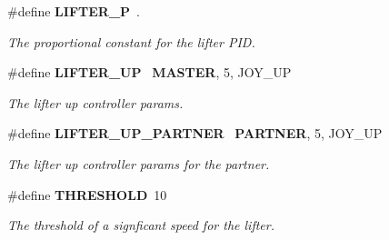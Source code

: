 \begin{DoxyCompactItemize}
\#define \textbf{ L\+I\+F\+T\+E\+R\+\_\+P}~.
\begin{DoxyCompactList}\small\item\em The proportional constant for the lifter P\+ID. \end{DoxyCompactList}\item 
\#define \textbf{ L\+I\+F\+T\+E\+R\+\_\+\+UP}~\textbf{ M\+A\+S\+T\+ER}, 5, J\+O\+Y\+\_\+\+UP
\begin{DoxyCompactList}\small\item\em The lifter up controller params. \end{DoxyCompactList}\item 
\#define \textbf{ L\+I\+F\+T\+E\+R\+\_\+\+U\+P\+\_\+\+P\+A\+R\+T\+N\+ER}~\textbf{ P\+A\+R\+T\+N\+ER}, 5, J\+O\+Y\+\_\+\+UP
\begin{DoxyCompactList}\small\item\em The lifter up controller params for the partner. \end{DoxyCompactList}\item 
\#define \textbf{ T\+H\+R\+E\+S\+H\+O\+LD}~10
\begin{DoxyCompactList}\small\item\em The threshold of a signficant speed for the lifter. \end{DoxyCompactList}\end{DoxyCompactItemize}
